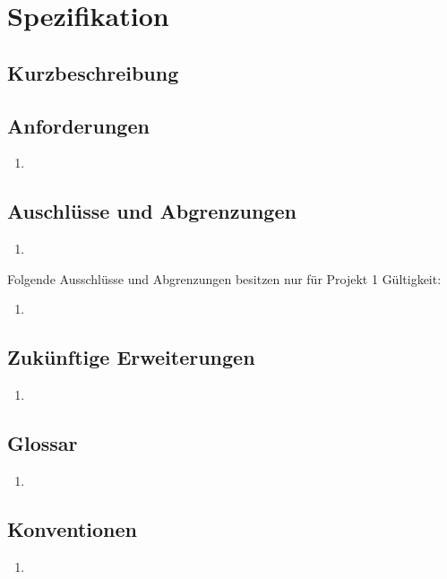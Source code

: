 \section{Spezifikation}

\subsection{Kurzbeschreibung}


\subsection{Anforderungen}

\begin{enumerate}
	\item
\end{enumerate}

\subsection{Auschlüsse und Abgrenzungen}

\begin{enumerate}
	\item
\end{enumerate}

Folgende Ausschlüsse und Abgrenzungen besitzen nur für Projekt 1 Gültigkeit:

\begin{enumerate}
	\item
\end{enumerate}

\subsection{Zukünftige Erweiterungen}

\begin{enumerate}
	\item
\end{enumerate}

\subsection{Glossar}

\begin{enumerate}
	\item
\end{enumerate}

\subsection{Konventionen}

\begin{enumerate}
	\item
\end{enumerate}